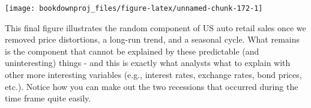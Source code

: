 \documentclass[
]{book}
\newenvironment{Shaded}{\begin{snugshade}}{\end{snugshade}}
\newcommand{\AttributeTok}[1]{\textcolor[rgb]{0.77,0.63,0.00}{#1}}
\newcommand{\ConstantTok}[1]{\textcolor[rgb]{0.00,0.00,0.00}{#1}}
\newcommand{\DecValTok}[1]{\textcolor[rgb]{0.00,0.00,0.81}{#1}}
\newcommand{\FunctionTok}[1]{\textcolor[rgb]{0.00,0.00,0.00}{#1}}
\newcommand{\NormalTok}[1]{#1}
\newcommand{\OtherTok}[1]{\textcolor[rgb]{0.56,0.35,0.01}{#1}}
\newcommand{\SpecialCharTok}[1]{\textcolor[rgb]{0.00,0.00,0.00}{#1}}
\newcommand{\StringTok}[1]{\textcolor[rgb]{0.31,0.60,0.02}{#1}}
\begin{document}
\begin{Shaded}
\end{Shaded}

\begin{center}\texttt{[image: bookdownproj\_files/figure-latex/unnamed-chunk-172-1]} \end{center}

This final figure illustrates the random component of US auto retail sales once we removed price distortions, a long-run trend, and a seasonal cycle. What remains is the component that cannot be explained by these predictable (and uninteresting) things - and this is exactly what analysts what to explain with other more interesting variables (e.g., interest rates, exchange rates, bond prices, etc.). Notice how you can make out the two recessions that occurred during the time frame quite easily.
\end{document}
